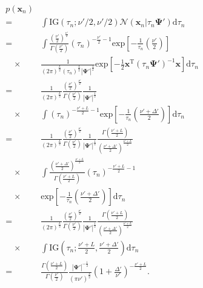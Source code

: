 \documentclass[journal]{IEEEtran}
\begin{document}
\begin{eqnarray}
	&p(\mathbf{x}_n) \nonumber\\ &=& \int \mathrm{IG}(\tau_n;\nu'/2,\nu'/2) \mathcal{N}(\mathbf{x}_n|\tau_n \mathbf{\Psi}') \mathrm{d}{\tau_n} \nonumber\\
	&=& \int \frac{\left(\frac{\nu'}{2}\right)^{\frac{\nu'}{2}}}{\Gamma \left(\frac{\nu'}{2}\right)} (\tau_n)^{-\frac{\nu'}{2}-1} \mathrm{exp} \left[-\frac{1}{\tau_n} \left(\frac{\nu'}{2} \right) \right] \nonumber\\
	&\quad\times&\frac{1}{(2\pi)^{\frac{L}{2}}(\tau_n)^{\frac{L}{2}}|\mathbf{\Psi'}|^{\frac{1}{2}}} \mathrm{exp} \left[-\frac{1}{2}\mathbf{x}^\mathrm{T} (\tau_n\mathbf{\Psi'})^{-1} \mathbf{x}\right] \mathrm{d}{\tau_n} \nonumber\\
	&=&\frac{1}{(2\pi)^{\frac{L}{2}}}\frac{\left(\frac{\nu'}{2}\right)^{\frac{\nu'}{2}}}{\Gamma \left(\frac{\nu'}{2}\right)}\frac{1}{|\mathbf{\Psi'}|^{\frac{1}{2}}} \nonumber\\
	&\quad\times& \int (\tau_n)^{-\frac{\nu'+L}{2}-1} \mathrm{exp} \left[-\frac{1}{\tau_n} \left(\frac{\nu' + \Delta'}{2}\right) \right] \mathrm{d}{\tau_n} \nonumber\\
	&=&\frac{1}{(2\pi)^{\frac{L}{2}}}\frac{\left(\frac{\nu'}{2}\right)^{\frac{\nu'}{2}}}{\Gamma \left(\frac{\nu'}{2}\right)}\frac{1}{|\mathbf{\Psi'}|^{\frac{1}{2}}} \frac{\Gamma \left(\frac{\nu'+L}{2}\right)}{\left(\frac{\nu'+\Delta'}{2}\right)^{\frac{\nu'+L}{2}}}\nonumber\\
	&\quad\times& \int \frac{\left(\frac{\nu'+\Delta'}{2}\right)^{\frac{\nu'+L}{2}}}{\Gamma \left(\frac{\nu'+L}{2}\right)} (\tau_n)^{-\frac{\nu'+L}{2}-1} \nonumber\\
	&\quad\times& \mathrm{exp} \left[-\frac{1}{\tau_n} \left(\frac{\nu' + \Delta'}{2}\right) \right] \mathrm{d}{\tau_n} \nonumber\\
	&=&\frac{1}{(2\pi)^{\frac{L}{2}}}\frac{\left(\frac{\nu'}{2}\right)^{\frac{\nu'}{2}}}{\Gamma \left(\frac{\nu'}{2}\right)}\frac{1}{|\mathbf{\Psi'}|^{\frac{1}{2}}} \frac{\Gamma \left(\frac{\nu'+L}{2}\right)}{\left(\frac{\nu'+\Delta'}{2}\right)^{\frac{\nu'+L}{2}}}\nonumber\\
	&\quad\times& \int \mathrm{IG}(\tau_n;\frac{\nu'+L}{2},\frac{\nu'+\Delta'}{2}) \mathrm{d}{\tau_n}\nonumber\\
	&=& \frac{\Gamma(\frac{\nu'+L}{2})}{\Gamma(\frac{\nu'}{2})} \frac{|{\bm \Psi'}|^{-\frac{1}{2}}}{\left(\pi \nu' \right)^{\frac{L}{2}}} \left(1+\frac{\Delta '}{\nu '} \right)^{-\frac{\nu'+L}{2}}.
\end{eqnarray}
\end{document}
